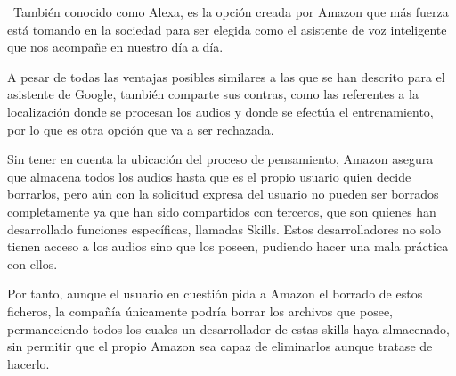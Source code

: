 ~También conocido como Alexa, es la opción creada por Amazon que más fuerza está tomando en la sociedad para ser elegida como el asistente de voz inteligente que nos acompañe en nuestro día a día.

A pesar de todas las ventajas posibles similares a las que se han descrito para el asistente de Google, también comparte sus contras, como las referentes a la localización donde se procesan los audios y donde se efectúa el entrenamiento, por lo que es otra opción que va a ser rechazada.

Sin tener en cuenta la ubicación del proceso de pensamiento, Amazon asegura\cite{escandalo-amazon} que almacena todos los audios hasta que es el propio usuario quien decide borrarlos, pero aún con la solicitud expresa del usuario no pueden ser borrados completamente ya que han sido compartidos con terceros, que son quienes han desarrollado funciones específicas, llamadas Skills. Estos desarrolladores no solo tienen acceso a los audios sino que los poseen, pudiendo hacer una mala práctica con ellos.

Por tanto, aunque el usuario en cuestión pida a Amazon el borrado de estos ficheros, la compañía únicamente podría borrar los archivos que posee, permaneciendo todos los cuales un desarrollador de estas skills haya almacenado, sin permitir que el propio Amazon sea capaz de eliminarlos aunque tratase de hacerlo.